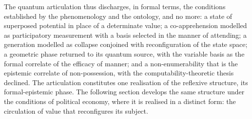 \noindent
The quantum articulation thus discharges, in formal terms, the conditions established by the phenomenology and the ontology, and no more: a state of superposed potential in place of a determinate value; a co-apprehension modelled as participatory measurement with a basis selected in the manner of attending; a generation modelled as collapse conjoined with reconfiguration of the state space; a geometric phase returned to its quantum source, with the variable basis as the formal correlate of the efficacy of manner; and a non-enumerability that is the epistemic correlate of non-possession, with the computability-theoretic thesis declined. The articulation constitutes one realisation of the reflexive structure, its formal-epistemic phase. The following section develops the same structure under the conditions of political economy, where it is realised in a distinct form: the circulation of value that reconfigures its subject.
